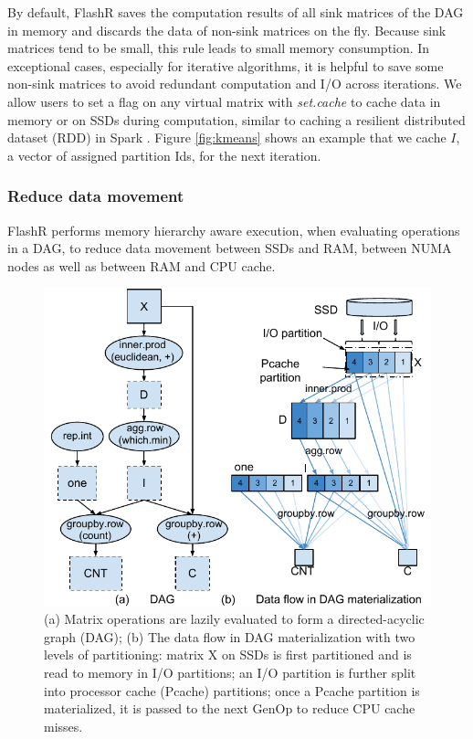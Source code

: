 By default, FlashR saves the computation results of all sink matrices of
the DAG in memory and discards the data of non-sink matrices on the fly.
Because sink matrices tend to be small, this rule leads to small memory
consumption. In exceptional cases, especially for iterative algorithms,
it is helpful to save some non-sink matrices to avoid redundant computation
and I/O across iterations. We allow users to
set a flag on any virtual matrix with \textit{set.cache} to
cache data in memory or on SSDs during computation, similar to caching
a resilient distributed dataset (RDD) in Spark \cite{spark}.
Figure \ref{fig:kmeans} shows an example that we cache $I$, a vector of
assigned partition Ids, for the next iteration.

\subsubsection{Reduce data movement}
FlashR performs memory hierarchy aware execution, when evaluating operations
in a DAG, to reduce data movement
between SSDs and RAM, between NUMA nodes as well as between RAM and CPU cache.

\begin{figure}
	\centering
	\includegraphics[scale=0.6]{FlashMatrix_figs/kmeans.pdf}
  \vspace{-4pt}
	\caption{(a) Matrix operations are lazily evaluated to form
	a directed-acyclic graph (DAG); (b) The data flow in DAG materialization
	with two levels of partitioning: matrix X on SSDs is first partitioned
	and is read to memory in I/O partitions; an I/O partition is further
	split into processor cache (Pcache) partitions; once a Pcache partition
	is materialized, it is passed to the next GenOp to reduce CPU cache misses. }
	\label{fig:dag}
  \vspace{-8pt}
\end{figure}

